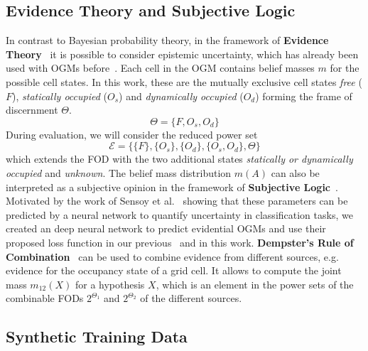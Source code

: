 \documentclass[conference]{IEEEtran}
\begin{document}
\subsection{Evidence Theory and Subjective Logic} \label{evidence_theory}

In contrast to Bayesian probability theory, in the framework of \textbf{Evidence Theory}~\cite{Shafer.1976} it is possible to consider epistemic uncertainty, which has already been used with OGMs before~\cite{Nuss.2018, Wirges.2018}. Each cell in the OGM contains belief masses $m$ for the possible cell states. In this work, these are the mutually exclusive cell states \textit{free} ($F$), \textit{statically occupied} ($O_s$) and \textit{dynamically occupied} ($O_d$) forming the frame of discernment $\Theta$.
\begin{equation}
\Theta = \{ F,O_s,O_d \}
\end{equation}
During evaluation, we will consider the reduced power set 
\begin{equation}
\mathcal{E} = \{ \{ F \}, \{ O_s \}, \{ O_d \}, \{ O_s, O_d \}, \Theta \}    
\end{equation}
which extends the FOD with the two additional states \textit{statically or dynamically occupied} and \textit{unknown}. The belief mass distribution $m(A)$ can also be interpreted as a subjective opinion in the framework of \textbf{Subjective Logic}~\cite{Jsang.2016}. Motivated by the work of Sensoy et al.~\cite{Sensoy.2018} showing that these parameters can be predicted by a neural network to quantify uncertainty in classification tasks, we created an deep neural network to predict evidential OGMs and use their proposed loss function in our previous~\cite{vanKempen.2021b} and in this work. \textbf{Dempster's Rule of Combination}~\cite{Shafer.2016} can be used to combine evidence from different sources, e.g. evidence for the occupancy state of a grid cell. It allows to compute the joint mass $m_{12}(X)$ for a hypothesis $X$, which is an element in the power sets of the combinable FODs $2^{{\Theta}_1}$ and $2^{{\Theta}_2}$ of the different sources.


\subsection{Synthetic Training Data}
\end{document}
